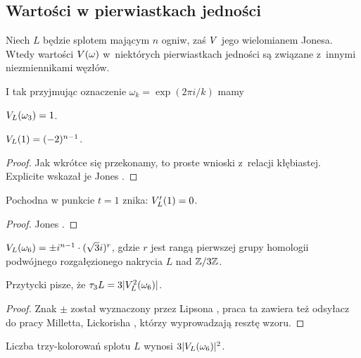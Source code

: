 
\subsection{Wartości w pierwiastkach jedności}
Niech $L$ będzie splotem mającym $n$ ogniw, zaś $V$ jego wielomianem Jonesa.
Wtedy wartości $V(\omega)$ w~niektórych pierwiastkach jedności są związane z~innymi niezmiennikami węzłów.

I tak przyjmując oznaczenie $\omega_k = \exp(2\pi i/k)$ mamy

\begin{proposition}
    \label{prp:jones_at_roots_of_unity}
    $V_L(\omega_3) = 1$.
\end{proposition}

\begin{proposition}
    $V_L(1) = (-2)^{n-1}$.
\end{proposition}

\begin{proof}
%
    Jak wkrótce się przekonamy, to proste wnioski z~relacji kłębiastej.
    Explicite wskazał je Jones \cite[twierdzenie 14, 15]{jones1985}.
\end{proof}

\begin{proposition}
    Pochodna w punkcie $t = 1$ znika: $V'_L(1) = 0$.
\end{proposition}

\begin{proof}
    Jones \cite[twierdzenie 16]{jones1985}.
\end{proof}

\begin{proposition}
    $V_L(\omega_6) = \pm i^{n-1} \cdot (\sqrt 3i)^r$, gdzie $r$ jest rangą pierwszej grupy homologii podwójnego rozgałęzionego nakrycia $L$ nad $\mathbb Z/3\mathbb Z$.
\end{proposition}

Przytycki \cite[s. 200]{przytycki1995} pisze, że $\tau_3 L = 3 |V_L^2 (\omega_6)|$.

\begin{proof}
%
    Znak $\pm$ został wyznaczony przez Lipsona \cite{lipson1986}, praca ta zawiera też odsyłacz do pracy Milletta, Lickorisha \cite{lickorish1986}, którzy wyprowadzają resztę wzoru.
\end{proof}

\begin{proposition}
    Liczba trzy-kolorowań splotu $L$ wynosi $3|V_L(\omega_6)|^2$.
\end{proposition}

